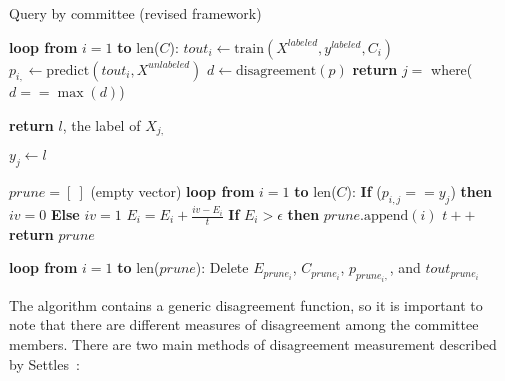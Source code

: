 \tablespacing
\begin{algorithm}[H]
	\caption{Query by committee (revised framework)}\label{alg:al:methods:qbc2}
	\begin{algorithmic}[1]
		
		\State \textbf{loop from} $i=1$ \textbf{to} len($C$):
		\State \indent $\textit{tout}_i \gets 
		\text{train}(X^{labeled},y^{labeled},C_i)$
		\State \indent $p_{i,} \gets 
		\text{predict}(\textit{tout}_i,X^{unlabeled})$
		\State $d \gets \text{disagreement}(p)$
		\State \textbf{return} $j =$ where($d==\max{(d)}$)
		\EndFunction
		
		\State \textbf{return} $l$, the label of $X_{j,}$
		\EndFunction
		
		\State $y_j \gets l$
		
		\State $prune = [\ ]$ (empty vector)	
		\State \textbf{loop from} $i=1$ \textbf{to} len($C$):
		\State \indent \textbf{If} ($p_{i,j}==y_j$) \textbf{then} $iv = 0$ 
		\textbf{Else} $iv = 1$
		\State \indent $E_i = E_i + \frac{iv - E_i}{t}$
		\State \indent \textbf{If} $E_i>\epsilon$ \textbf{then} 
		$prune.\text{append}(i)$
		\State $t++$
		\State \textbf{return} $prune$
		\EndFunction
		
		\State \textbf{loop from} $i=1$ \textbf{to} len($prune$):
		\State \indent Delete $E_{prune_i}$, $C_{prune_i}$, $p_{prune_i,}$, 
		and $\textit{tout}_{prune_i}$
		
		\EndProcedure
	\end{algorithmic}
\end{algorithm}
\bodyspacing

The algorithm contains a generic disagreement function, so it is important to 
note that there are different measures of disagreement among the committee 
members. There are two main methods of disagreement 
measurement described by Settles~\cite{settles2010}:

